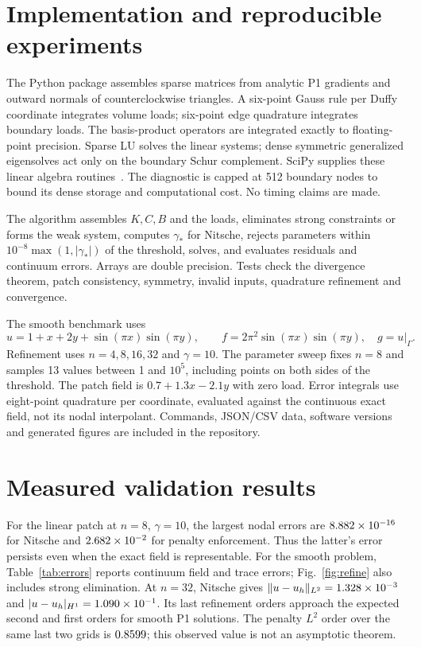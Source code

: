 \documentclass[11pt,a4paper]{article}
\begin{document}
\section{Implementation and reproducible experiments}
The Python package assembles sparse matrices from analytic P1 gradients and
outward normals of counterclockwise triangles. A six-point Gauss rule per Duffy
coordinate integrates volume loads; six-point edge quadrature integrates boundary
loads. The basis-product operators are integrated exactly to floating-point
precision. Sparse LU solves the linear systems; dense symmetric generalized
eigensolves act only on the boundary Schur complement. SciPy supplies these
linear algebra routines~\cite{scipy}. The diagnostic is capped at 512 boundary
nodes to bound its dense storage and computational cost. No timing claims are made.

The algorithm assembles $K,C,B$ and the loads, eliminates strong constraints or
forms the weak system, computes $\gamma_*$ for Nitsche, rejects parameters within
$10^{-8}\max(1,|\gamma_*|)$ of the threshold, solves, and evaluates residuals and
continuum errors. Arrays are double precision. Tests check the divergence theorem,
patch consistency, symmetry, invalid inputs, quadrature refinement and convergence.

The smooth benchmark uses
\begin{equation}
 u=1+x+2y+\sin(\pi x)\sin(\pi y),\qquad
 f=2\pi^2\sin(\pi x)\sin(\pi y),\quad g=u|_\Gamma .
\end{equation}
Refinement uses $n=4,8,16,32$ and $\gamma=10$. The parameter sweep fixes $n=8$
and samples 13 values between 1 and $10^5$, including points on both sides of the
threshold. The patch field is $0.7+1.3x-2.1y$ with zero load. Error integrals use
eight-point quadrature per coordinate, evaluated against the continuous exact
field, not its nodal interpolant. Commands, JSON/CSV data, software versions and
generated figures are included in the repository.

\newpage
\section{Measured validation results}
For the linear patch at $n=8$, $\gamma=10$, the largest nodal errors are
$8.882\times10^{-16}$ for Nitsche and $2.682\times10^{-2}$ for penalty enforcement. Thus the latter's
error persists even when the exact field is representable. For the smooth
problem, Table~\ref{tab:errors} reports continuum field and trace errors; Fig.~\ref{fig:refine}
also includes strong elimination. At $n=32$, Nitsche gives $\|u-u_h\|_{L^2}=1.328\times10^{-3}$
and $|u-u_h|_{H^1}=1.090\times10^{-1}$. Its last refinement orders approach the expected
second and first orders for smooth P1 solutions. The penalty $L^2$ order over
the same last two grids is $0.8599$; this observed value is not an
asymptotic theorem.
\end{document}
